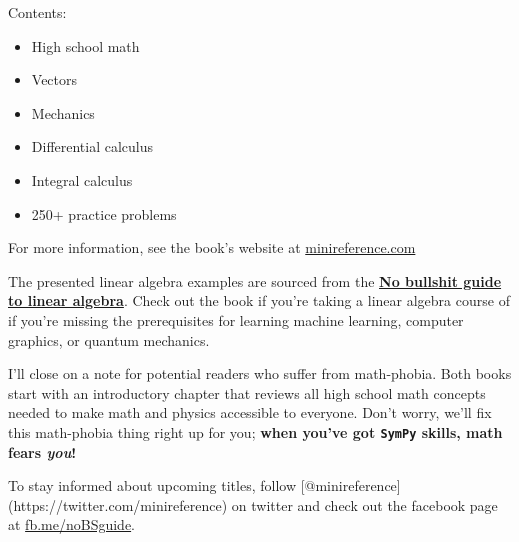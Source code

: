 \documentclass{article}
\begin{document}
Contents:

\begin{itemize}
\itemsep1pt\parskip0pt
\item
  High school math
\item
  Vectors
\item
  Mechanics
\item
  Differential calculus
\item
  Integral calculus
\item
  250+ practice problems
\end{itemize}

For more information, see the book's website at
\href{http://minireference.com/}{minireference.com}

The presented linear algebra examples are sourced from the
\href{https://gum.co/noBSLA}{\textbf{No bullshit guide to linear
algebra}}. Check out the book if you're taking a linear algebra course
of if you're missing the prerequisites for learning machine learning,
computer graphics, or quantum mechanics.

I'll close on a note for potential readers who suffer from math-phobia.
Both books start with an introductory chapter that reviews all high
school math concepts needed to make math and physics accessible to
everyone. Don't worry, we'll fix this math-phobia thing right up for
you; \textbf{when you've got \texttt{SymPy} skills, math fears
\emph{you}!}

To stay informed about upcoming titles, follow
{[}@minireference{]}(https://twitter.com/minireference) on twitter and
check out the facebook page at
\href{http://fb.me/noBSguide}{fb.me/noBSguide}.


    
    
    
    
\end{document}
